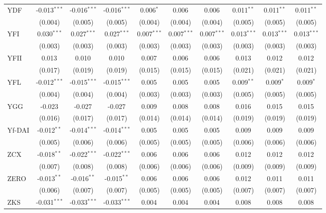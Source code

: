 \begin{table}[!htbp]
\begin{tabular}{@{\extracolsep{5pt}}lccccccccc}
 YDF & -0.013$^{***}$ & -0.016$^{***}$ & -0.016$^{***}$ & 0.006$^{*}$ & 0.006$^{}$ & 0.006$^{}$ & 0.011$^{**}$ & 0.011$^{**}$ & 0.011$^{**}$ \\
  & (0.004) & (0.005) & (0.005) & (0.004) & (0.004) & (0.004) & (0.005) & (0.005) & (0.005) \\
 YFI & 0.030$^{***}$ & 0.027$^{***}$ & 0.027$^{***}$ & 0.007$^{***}$ & 0.007$^{***}$ & 0.007$^{***}$ & 0.013$^{***}$ & 0.013$^{***}$ & 0.013$^{***}$ \\
  & (0.003) & (0.003) & (0.003) & (0.003) & (0.003) & (0.003) & (0.003) & (0.003) & (0.003) \\
 YFII & 0.013$^{}$ & 0.010$^{}$ & 0.010$^{}$ & 0.007$^{}$ & 0.006$^{}$ & 0.006$^{}$ & 0.013$^{}$ & 0.012$^{}$ & 0.012$^{}$ \\
  & (0.017) & (0.019) & (0.019) & (0.015) & (0.015) & (0.015) & (0.021) & (0.021) & (0.021) \\
 YFL & -0.012$^{***}$ & -0.015$^{***}$ & -0.015$^{***}$ & 0.005$^{}$ & 0.005$^{}$ & 0.005$^{}$ & 0.009$^{**}$ & 0.009$^{*}$ & 0.009$^{*}$ \\
  & (0.004) & (0.004) & (0.004) & (0.003) & (0.003) & (0.003) & (0.005) & (0.005) & (0.005) \\
 YGG & -0.023$^{}$ & -0.027$^{}$ & -0.027$^{}$ & 0.009$^{}$ & 0.008$^{}$ & 0.008$^{}$ & 0.016$^{}$ & 0.015$^{}$ & 0.015$^{}$ \\
  & (0.016) & (0.017) & (0.017) & (0.014) & (0.014) & (0.014) & (0.019) & (0.019) & (0.019) \\
 Yf-DAI & -0.012$^{**}$ & -0.014$^{***}$ & -0.014$^{***}$ & 0.005$^{}$ & 0.005$^{}$ & 0.005$^{}$ & 0.009$^{}$ & 0.009$^{}$ & 0.009$^{}$ \\
  & (0.005) & (0.006) & (0.006) & (0.005) & (0.005) & (0.005) & (0.006) & (0.006) & (0.006) \\
 ZCX & -0.018$^{**}$ & -0.022$^{***}$ & -0.022$^{***}$ & 0.006$^{}$ & 0.006$^{}$ & 0.006$^{}$ & 0.012$^{}$ & 0.012$^{}$ & 0.012$^{}$ \\
  & (0.007) & (0.008) & (0.008) & (0.006) & (0.006) & (0.006) & (0.009) & (0.009) & (0.009) \\
 ZERO & -0.013$^{**}$ & -0.016$^{**}$ & -0.015$^{**}$ & 0.006$^{}$ & 0.006$^{}$ & 0.006$^{}$ & 0.012$^{}$ & 0.011$^{}$ & 0.011$^{}$ \\
  & (0.006) & (0.007) & (0.007) & (0.005) & (0.005) & (0.005) & (0.007) & (0.007) & (0.007) \\
 ZKS & -0.031$^{***}$ & -0.033$^{***}$ & -0.033$^{***}$ & 0.004$^{}$ & 0.004$^{}$ & 0.004$^{}$ & 0.008$^{}$ & 0.008$^{}$ & 0.008$^{}$ \\

\end{tabular}
\end{table}

